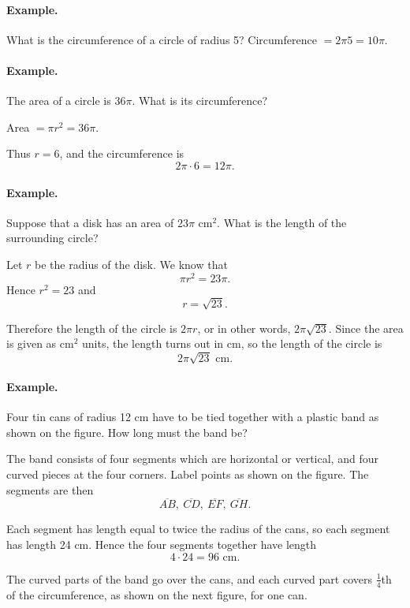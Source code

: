 \documentclass[12pt]{book} %
\begin{document}
\paragraph{Example.}
What is the circumference of a circle of radius 5? Circumference $=2\pi 5=10\pi$.

\paragraph{Example.}
The area of a circle is $36\pi$. What is its circumference?

Area $=\pi r^2=36\pi$.

Thus $r=6$, and the circumference is
\[
2\pi \cdot 6=12\pi.
\]

\paragraph{Example.}
Suppose that a disk has an area of $23\pi$ cm$^2$. What is the length of the surrounding circle?

Let $r$ be the radius of the disk. We know that
\[
\pi r^2=23\pi.
\]
Hence $r^2=23$ and
\[
r=\sqrt{23}.
\]

Therefore the length of the circle is $2\pi r$, or in other words, $2\pi\sqrt{23}$.
Since the area is given as cm$^2$ units, the length turns out in cm, so the length of the circle is
\[
2\pi\sqrt{23}\text{ cm.}
\]

\paragraph{Example.}
Four tin cans of radius 12 cm have to be tied together with a plastic band as shown on the figure. How long must the band be?


The band consists of four segments which are horizontal or vertical, and four curved pieces at the four corners. Label points as shown on the figure. The segments are then
\[
\overline{AB},\ \overline{CD},\ \overline{EF},\ \overline{GH}.
\]

Each segment has length equal to twice the radius of the cans, so each segment has length 24 cm. Hence the four segments together have length
\[
4\cdot 24=96\text{ cm.}
\]

The curved parts of the band go over the cans, and each curved part covers $\frac14$th of the circumference, as shown on the next figure, for one can.

\end{document}
